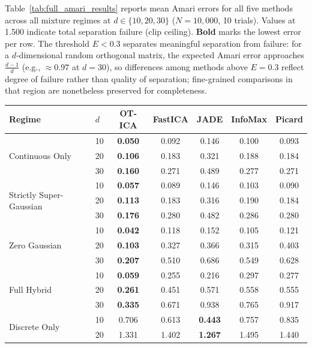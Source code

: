 \documentclass{tpm2026} %
\begin{document}
Table~\ref{tab:full_amari_results} reports mean Amari errors for all five methods across all mixture regimes at $d \in \{10, 20, 30\}$ ($N=10{,}000$, 10 trials). Values at 1.500 indicate total separation failure (clip ceiling). \textbf{Bold} marks the lowest error per row. The threshold $E < 0.3$ separates meaningful separation from failure: for a $d$-dimensional random orthogonal matrix, the expected Amari error approaches $\frac{d-1}{d}$ (e.g., $\approx 0.97$ at $d=30$), so differences among methods above $E=0.3$ reflect degree of failure rather than quality of separation; fine-grained comparisons in that region are nonetheless preserved for completeness.

\begin{table}[htbp]
\centering
\setlength{\tabcolsep}{10pt}
\begin{tabular}{llccccc}
\toprule
\textbf{Regime} & $d$ & \textbf{OT-ICA} & \textbf{FastICA} & \textbf{JADE} & \textbf{InfoMax} & \textbf{Picard} \\
\midrule
\multirow{3}{*}{Continuous Only}
 & 10 & \textbf{0.050} & 0.092 & 0.146 & 0.100 & 0.093 \\
 & 20 & \textbf{0.106} & 0.183 & 0.321 & 0.188 & 0.184 \\
 & 30 & \textbf{0.160} & 0.271 & 0.489 & 0.277 & 0.271 \\
\midrule
\multirow{3}{*}{Strictly Super-Gaussian}
 & 10 & \textbf{0.057} & 0.089 & 0.146 & 0.103 & 0.090 \\
 & 20 & \textbf{0.113} & 0.183 & 0.316 & 0.190 & 0.184 \\
 & 30 & \textbf{0.176} & 0.280 & 0.482 & 0.286 & 0.280 \\
\midrule
\multirow{3}{*}{Zero Gaussian}
 & 10 & \textbf{0.042} & 0.118 & 0.152 & 0.105 & 0.121 \\
 & 20 & \textbf{0.103} & 0.327 & 0.366 & 0.315 & 0.403 \\
 & 30 & \textbf{0.207} & 0.510 & 0.686 & 0.549 & 0.628 \\
\midrule
\multirow{3}{*}{Full Hybrid}
 & 10 & \textbf{0.059} & 0.255 & 0.216 & 0.297 & 0.277 \\
 & 20 & \textbf{0.261} & 0.451 & 0.571 & 0.558 & 0.555 \\
 & 30 & \textbf{0.335} & 0.671 & 0.938 & 0.765 & 0.917 \\
\midrule
\multirow{3}{*}{Discrete Only}
 & 10 & 0.706 & 0.613 & \textbf{0.443} & 0.757 & 0.835 \\
 & 20 & 1.331 & 1.402 & \textbf{1.267} & 1.495 & 1.440 \\

\end{tabular}
\end{table}
\end{document}
